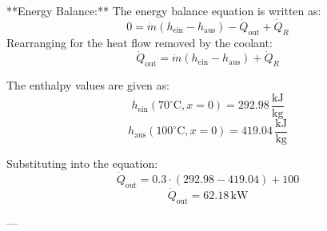 **Energy Balance:**  
The energy balance equation is written as:  
\[
0 = \dot{m} (h_{\text{ein}} - h_{\text{aus}}) - \dot{Q}_{\text{out}} + \dot{Q}_R
\]  
Rearranging for the heat flow removed by the coolant:  
\[
\dot{Q}_{\text{out}} = \dot{m} (h_{\text{ein}} - h_{\text{aus}}) + \dot{Q}_R
\]  

The enthalpy values are given as:  
\[
h_{\text{ein}} (70^\circ\text{C}, x = 0) = 292.98 \, \frac{\text{kJ}}{\text{kg}}
\]  
\[
h_{\text{aus}} (100^\circ\text{C}, x = 0) = 419.04 \, \frac{\text{kJ}}{\text{kg}}
\]  

Substituting into the equation:  
\[
\dot{Q}_{\text{out}} = 0.3 \cdot (292.98 - 419.04) + 100
\]  
\[
\dot{Q}_{\text{out}} = 62.18 \, \text{kW}
\]  

---